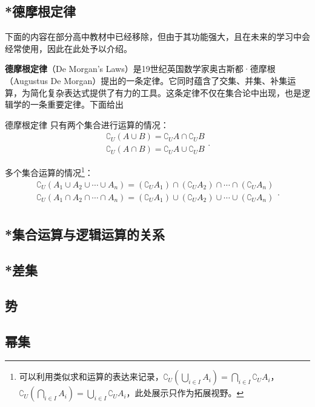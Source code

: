 \subsection{*德摩根定律}

下面的内容在部分高中教材中已经移除，但由于其功能强大，且在未来的学习中会经常使用，因此在此处予以介绍。

\textbf{德摩根定律}（De Morgan’s Laws）是19世纪英国数学家奥古斯都·德摩根（Augustus De Morgan）提出的一条定律。它同时蕴含了交集、并集、补集运算，为简化复杂表达式提供了有力的工具。这条定律不仅在集合论中出现，也是逻辑学的一条重要定律。下面给出

\begin{theorem}{德摩根定律}
只有两个集合进行运算的情况：
\begin{equation}
\begin{array}{c} 
 \complement_U(A \cup B) = \complement_U A \cap \complement_U B \\  
\complement_U(A \cap B) = \complement_U A \cup \complement_U B
\end{array}.~
\end{equation}

多个集合运算的情况\footnote{可以利用类似求和运算的表达来记录，$\displaystyle\complement_U(\bigcup_{i\in I} A_i)=\bigcap_{i\in I} {\complement_UA_i}$，$\displaystyle\complement_U(\bigcap_{i\in I} A_i)=\bigcup_{i\in I} {\complement_UA_i}$，此处展示只作为拓展视野。}：
\begin{equation}
\begin{array}{c} 
\displaystyle
\complement_U(A_1\cup A_2\cup\cdots\cup A_n)=(\complement_UA_1)\cap (\complement_UA_2)\cap\cdots\cap(\complement_UA_n)\\  
\displaystyle
\complement_U(A_1\cap A_2\cap\cdots\cap A_n)=(\complement_UA_1)\cup (\complement_UA_2)\cup\cdots\cup(\complement_UA_n)\\  
\end{array}.~
\end{equation}
\end{theorem}




\subsection{*集合运算与逻辑运算的关系}



\subsection{*差集}
\subsection{势}
\subsection{幂集}
